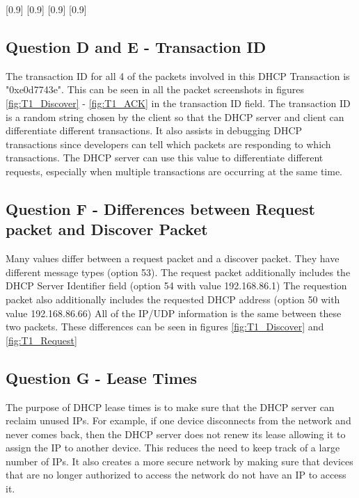 \documentclass{assignment-x}
\begin{document}
\begin{landscape}
    \begin{multicols}{2}
    [0.9\linewidth]
    [0.9\linewidth]
    \columnbreak
    [0.9\linewidth]
    [0.9\linewidth]
    \end{multicols}
\end{landscape}

\subsection{Question D and E - Transaction ID}
The transaction ID for all 4 of the packets involved in this DHCP Transaction is "0xe0d7743e". This can be seen in all the packet screenshots in figures \ref{fig:T1_Discover} - \ref{fig:T1_ACK} in the transaction ID field. The transaction ID is a random string chosen by the client so that the DHCP server and client can differentiate different transactions. It also assists in debugging DHCP transactions since developers can tell which packets are responding to which transactions. The DHCP server can use this value to differentiate different requests, especially when multiple transactions are occurring at the same time.

\subsection{Question F - Differences between Request packet and Discover Packet}
Many values differ between a request packet and a discover packet. They have different message types (option 53). The request packet additionally includes the DHCP Server Identifier field (option 54 with value 192.168.86.1) The requestion packet also additionally includes the requested DHCP address (option 50 with value 192.168.86.66) All of the IP/UDP information is the same between these two packets. These differences can be seen in figures \ref{fig:T1_Discover} and \ref{fig:T1_Request}

\subsection{Question G - Lease Times}
The purpose of DHCP lease times is to make sure that the DHCP server can reclaim unused IPs. For example, if one device disconnects from the network and never comes back, then the DHCP server does not renew its lease allowing it to assign the IP to another device. This reduces the need to keep track of a large number of IPs. It also creates a more secure network by making sure that devices that are no longer authorized to access the network do not have an IP to access it.
\end{document}
